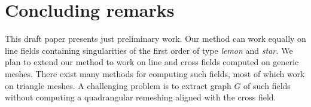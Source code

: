 \documentclass[11pt,a4paper]{article}
\begin{document}
\section{Concluding remarks}
\label{sec:conc}
This draft paper presents just preliminary work.
Our method can work equally on line fields containing singularities of the first order of type \emph{lemon} and \emph{star.}
We plan to extend our method to work on line and cross fields computed on generic meshes. 
There exist many methods for computing such fields, most of which work on triangle meshes.
A challenging problem is to extract graph $G$ of such fields without computing a quadrangular remeshing aligned with the cross field.  

  













\end{document}
